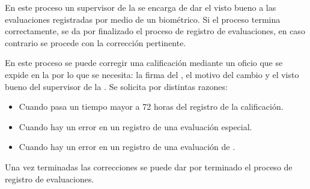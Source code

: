\begin{PDescripcion}
\begin{enumerate}
		\Ppaso[\PSubProceso]  En este proceso un supervisor de la  se encarga de dar el visto bueno a las evaluaciones registradas por medio de un biométrico. 
		Si el proceso termina correctamente, se da por finalizado el proceso de registro de evaluaciones, en caso contrario se procede con la corrección pertinente.
		
		\Ppaso[\PSubProceso]  En este proceso se puede corregir una calificación mediante un oficio que se expide en la  por lo que se necesita:
		la firma del , el motivo del cambio y el visto bueno del supervisor de la . Se solicita por distintas razones:
		
		\begin{itemize}
			\item Cuando pasa un tiempo mayor a 72 horas del registro de la calificación.
		\end{itemize}
		\begin{itemize}
			\item Cuando hay un error en un registro de una evaluación especial.
		\end{itemize}
		\begin{itemize}
			\item Cuando hay un error en un registro de una evaluación de .
		\end{itemize}	
		Una vez terminadas las correcciones se puede dar por terminado el proceso de registro de evaluaciones.
		
	\end{enumerate}
\end{PDescripcion}